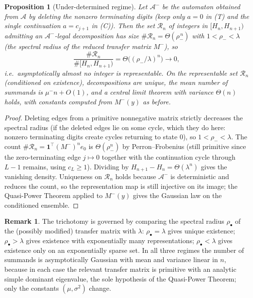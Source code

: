 \documentclass[12pt]{article}
\newtheorem{proposition}{Proposition}
\theoremstyle{definition}
\newtheorem{remark}{Remark}
\begin{document}
\begin{proposition}[Under-determined regime]\label{prop:none}
Let $\mathcal A^{-}$ be the automaton obtained from $\mathcal A$ by deleting the
nonzero terminating digits (keep only $a=0$ in (T) and the single continuation
$a=c_{j+1}$ in (C)). Then the set $\mathcal R_n$ of integers in $[H_n,H_{n+1})$
admitting an $\mathcal A^{-}$-legal decomposition has size
$\#\mathcal R_n=\Theta(\rho_-^{\,n})$ with $1<\rho_-<\lambda$ (the spectral
radius of the reduced transfer matrix $M^{-}$), so
\[
\frac{\#\mathcal R_n}{\#[H_n,H_{n+1})}=\Theta\!\big((\rho_-/\lambda)^n\big)\to0 ,
\]
i.e.\ asymptotically almost no integer is representable. On the representable set
$\mathcal R_n$ (conditioned on existence), decompositions are unique, the mean
number of summands is $\mu^{-}n+O(1)$, and a central limit theorem with variance
$\Theta(n)$ holds, with constants computed from $M^{-}(y)$ as before.
\end{proposition}

\begin{proof}
Deleting edges from a primitive nonnegative matrix strictly decreases the
spectral radius (if the deleted edges lie on some cycle, which they do here:
nonzero terminating digits create cycles returning to state $0$), so
$1<\rho_-<\lambda$. The count $\#\mathcal R_n=\mathbf 1^{\!\top}(M^{-})^n e_0$
is $\Theta(\rho_-^n)$ by Perron--Frobenius (still primitive since the
zero-terminating edge $j\mapsto0$ together with the continuation cycle through
$L-1$ remains, using $c_L\ge1$). Dividing by $H_{n+1}-H_n=\Theta(\lambda^n)$
gives the vanishing density. Uniqueness on $\mathcal R_n$ holds because
$\mathcal A^{-}$ is deterministic and reduces the count, so the representation
map is still injective on its image; the Quasi-Power Theorem applied to
$M^{-}(y)$ gives the Gaussian law on the conditioned ensemble.
\end{proof}

\begin{remark}
The trichotomy is governed by comparing the spectral radius $\rho_\bullet$ of the
(possibly modified) transfer matrix with $\lambda$: $\rho_\bullet=\lambda$ gives
unique existence; $\rho_\bullet>\lambda$ gives existence with exponentially many
representations; $\rho_\bullet<\lambda$ gives existence only on an exponentially
sparse set. In all three regimes the number of summands is asymptotically
Gaussian with mean and variance linear in $n$, because in each case the relevant
transfer matrix is primitive with an analytic simple dominant eigenvalue, the
sole hypothesis of the Quasi-Power Theorem; only the constants $(\mu,\sigma^2)$
change.
\end{remark}
\end{document}
